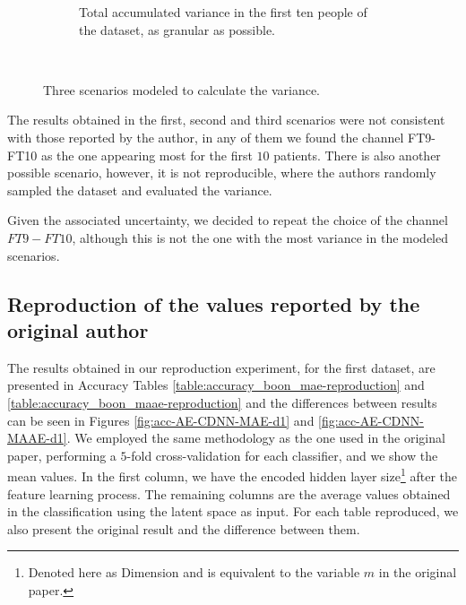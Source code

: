 \begin{figure}[!ht]
\begin{subfigure}{\linewidth}
\caption{Total accumulated variance in the first ten people of the dataset, as granular as possible.}
\label{fig:variance_all_files}
\end{subfigure}\\
\caption{Three scenarios modeled to calculate the variance.}
\end{figure}


The results obtained in the first, second and third scenarios were not consistent with those reported by the author, in any of them we found the channel FT9-FT10 as the one appearing most for the first $10$ patients. There is also another possible scenario, however, it is not reproducible, where the authors randomly sampled the dataset and evaluated the variance.

Given the associated uncertainty, we decided to repeat the choice of the channel $FT9-FT10$, although this is not the one with the most variance in the modeled scenarios.


\subsection{Reproduction of the values reported by the original author}

The results obtained in our reproduction experiment, for the first dataset, are presented in Accuracy Tables \ref{table:accuracy_boon_mae-reproduction} and \ref{table:accuracy_boon_maae-reproduction} and the differences between results can be seen in Figures \ref{fig:acc-AE-CDNN-MAE-d1} and \ref{fig:acc-AE-CDNN-MAAE-d1}. We employed the same methodology as the one used in the original paper, performing a $5$-fold cross-validation for each classifier, and we show the mean values.
In the first column, we have the encoded hidden layer size\footnote{Denoted here as Dimension and is equivalent to the variable $m$ in the original paper.} after the feature learning process. The remaining columns are the average values obtained in the classification using the latent space as input. For each table reproduced, we also present the original result and the difference between them.







